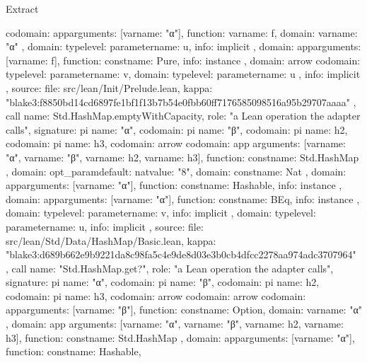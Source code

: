 \begin{lexlean}{Extract}
\begin{toolingmodule}
{{{{{{              codomain: app{arguments: [var{name: "α"}], function: var{name: f}},
              domain: var{name: "α"}
            },
            domain: type{level: parameter{name: u}},
            info: implicit
          },
          domain: app{arguments: [var{name: f}], function: const{name: Pure}},
          info: instance
        },
        domain: arrow{
          codomain: type{level: parameter{name: v}},
          domain: type{level: parameter{name: u}}
        },
        info: implicit
      },
      source: {
        file: src/lean/Init/Prelude.lean,
        kappa: "blake3:f8850bd14cd6897fe1bf1f13b7b54e0fbb60ff7176585098516a95b29707aaaa"
      }
    },
    call{
      name: Std.HashMap.emptyWithCapacity,
      role: "a Lean operation the adapter calls",
      signature: pi{
        name: "α",
        codomain: pi{
          name: "β",
          codomain: pi{
            name: h2,
            codomain: pi{
              name: h3,
              codomain: arrow{
                codomain: app{
                  arguments: [var{name: "α"}, var{name: "β"}, var{name: h2}, var{name: h3}],
                  function: const{name: Std.HashMap}
                },
                domain: opt_param{default: nat{value: "8"}, domain: const{name: Nat}}
              },
              domain: app{arguments: [var{name: "α"}], function: const{name: Hashable}},
              info: instance
            },
            domain: app{arguments: [var{name: "α"}], function: const{name: BEq}},
            info: instance
          },
          domain: type{level: parameter{name: v}},
          info: implicit
        },
        domain: type{level: parameter{name: u}},
        info: implicit
      },
      source: {
        file: src/lean/Std/Data/HashMap/Basic.lean,
        kappa: "blake3:d689b662e9b9221da8c98fa5c4e9de8d03e3b0cb4dfcc2278aa974adc3707964"
      }
    },
    call{
      name: "Std.HashMap.get?",
      role: "a Lean operation the adapter calls",
      signature: pi{
        name: "α",
        codomain: pi{
          name: "β",
          codomain: pi{
            name: h2,
            codomain: pi{
              name: h3,
              codomain: arrow{
                codomain: arrow{
                  codomain: app{arguments: [var{name: "β"}], function: const{name: Option}},
                  domain: var{name: "α"}
                },
                domain: app{
                  arguments: [var{name: "α"}, var{name: "β"}, var{name: h2}, var{name: h3}],
                  function: const{name: Std.HashMap}
                }
              },
              domain: app{arguments: [var{name: "α"}], function: const{name: Hashable}},
}}}}}}
\end{toolingmodule}
\end{lexlean}
